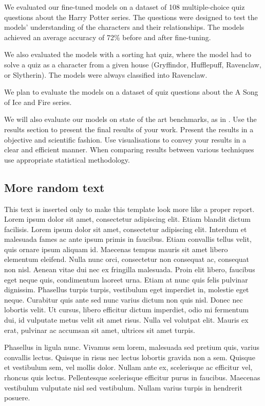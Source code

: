 \documentclass[fleqn,moreauthors,10pt]{ds_report}
\begin{document}

We evaluated our fine-tuned models on a dataset of 108 multiple-choice quiz questions about the Harry Potter series.
The questions were designed to test the models' understanding of the characters and their relationships.
The models achieved an average accuracy of 72\% before and after fine-tuning.

We also evaluated the models with a sorting hat quiz, where the model had to solve a quiz as a character from a given house (Gryffindor, Hufflepuff, Ravenclaw, or Slytherin).
The models were always classified into Ravenclaw.

We plan to evaluate the models on a dataset of quiz questions about the A Song of Ice and Fire series.

We will also evaluate our models on state of the art benchmarks, as in \cite{guo2023evaluating}.
Use the results section to present the final results of your work. Present the results in a objective and scientific fashion. Use visualisations to convey your results in a clear and efficient manner. When comparing results between various techniques use appropriate statistical methodology.

\subsection*{More random text}

This text is inserted only to make this template look more like a proper report. Lorem ipsum dolor sit amet, consectetur adipiscing elit. Etiam blandit dictum facilisis. Lorem ipsum dolor sit amet, consectetur adipiscing elit. Interdum et malesuada fames ac ante ipsum primis in faucibus. Etiam convallis tellus velit, quis ornare ipsum aliquam id. Maecenas tempus mauris sit amet libero elementum eleifend. Nulla nunc orci, consectetur non consequat ac, consequat non nisl. Aenean vitae dui nec ex fringilla malesuada. Proin elit libero, faucibus eget neque quis, condimentum laoreet urna. Etiam at nunc quis felis pulvinar dignissim. Phasellus turpis turpis, vestibulum eget imperdiet in, molestie eget neque. Curabitur quis ante sed nunc varius dictum non quis nisl. Donec nec lobortis velit. Ut cursus, libero efficitur dictum imperdiet, odio mi fermentum dui, id vulputate metus velit sit amet risus. Nulla vel volutpat elit. Mauris ex erat, pulvinar ac accumsan sit amet, ultrices sit amet turpis.

Phasellus in ligula nunc. Vivamus sem lorem, malesuada sed pretium quis, varius convallis lectus. Quisque in risus nec lectus lobortis gravida non a sem. Quisque et vestibulum sem, vel mollis dolor. Nullam ante ex, scelerisque ac efficitur vel, rhoncus quis lectus. Pellentesque scelerisque efficitur purus in faucibus. Maecenas vestibulum vulputate nisl sed vestibulum. Nullam varius turpis in hendrerit posuere.
\end{document}
